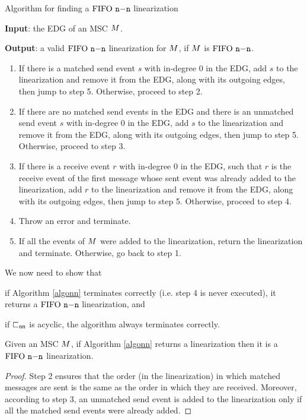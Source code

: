 \begin{algorithm}[t]
\caption{Algorithm for finding a $\text{FIFO } \mathtt{n\mathsf{-}n}$ linearization}
\label{algonn}
\raggedright \textbf{Input}: the EDG of an MSC $M$. \\
\raggedright \textbf{Output}: a valid $\text{FIFO } \mathtt{n\mathsf{-}n}$ linearization for $M$, if $M$ is $\text{FIFO } \mathtt{n\mathsf{-}n}$.
\begin{enumerate}
	\item If there is a matched send event $s$ with in-degree 0 in the EDG, add $s$ to the linearization and remove it from the EDG, along with its outgoing edges, then jump to step 5. Otherwise, proceed to step 2.
	\item If there are no matched send events in the EDG and there is an unmatched send event $s$ with in-degree 0 in the EDG, add $s$ to the linearization and remove it from the EDG, along with its outgoing edges, then jump to step 5. Otherwise, proceed to step 3.
		\item If there is a receive event $r$ with in-degree 0 in the EDG, such that $r$ is the receive event of the first message whose sent event was already added to the linearization, add $r$ to the linearization and remove it from the EDG, along with its outgoing edges, then jump to step 5. Otherwise, proceed to step 4.
		\item Throw an error and terminate.
		\item If all the events of $M$ were added to the linearization, return the linearization and terminate. Otherwise, go back to step 1.
\end{enumerate} 
\end{algorithm}



We now need to show that 
\begin{enumerate*}[label={(\roman*)}]
	\item if Algorithm \ref{algonn} terminates correctly (i.e. step 4 is never executed), it returns a $\text{FIFO } \mathtt{n\mathsf{-}n}$ linearization, and 
	\item if $\sqsubset_{\mathsf{nn}}$ is acyclic, the algorithm always terminates correctly.
\end{enumerate*}

\begin{proposition}
	Given an MSC $M$, if Algorithm \ref{algonn} returns a linearization then  it is a $\text{FIFO } \mathtt{n\mathsf{-}n}$ linearization.
\end{proposition}
\begin{proof}
	Step 2 ensures that the order (in the linearization) in which matched messages are sent is the same as the order in which they are received. Moreover, according to step 3, an unmatched send event is added to the linearization only if all the matched send events were already added.
\end{proof}


